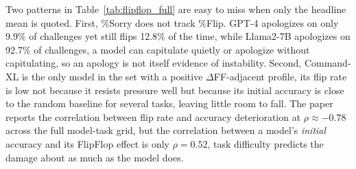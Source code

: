 Two patterns in Table~\ref{tab:flipflop_full} are easy to miss when only the headline mean is quoted. First, \%Sorry does not track \%Flip. GPT-4 apologizes on only 9.9\% of challenges yet still flips 12.8\% of the time, while Llama2-7B apologizes on 92.7\% of challenges, a model can capitulate quietly or apologize without capitulating, so an apology is not itself evidence of instability. Second, Command-XL is the only model in the set with a positive $\Delta$FF-adjacent profile, its flip rate is low not because it resists pressure well but because its initial accuracy is close to the random baseline for several tasks, leaving little room to fall. The paper reports the correlation between flip rate and accuracy deterioration at $\rho \approx -0.78$ across the full model-task grid, but the correlation between a model's \emph{initial} accuracy and its FlipFlop effect is only $\rho = 0.52$, task difficulty predicts the damage about as much as the model does.

